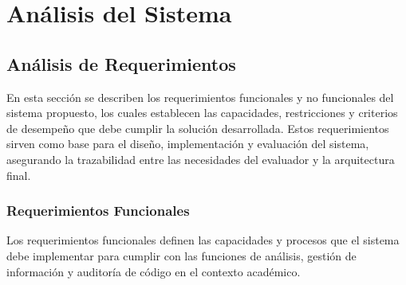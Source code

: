 \chapter{Análisis del Sistema}

\section{Análisis de Requerimientos}

En esta sección se describen los requerimientos funcionales y no funcionales del sistema propuesto, los cuales establecen las capacidades, restricciones y criterios de desempeño que debe cumplir la solución desarrollada. Estos requerimientos sirven como base para el diseño, implementación y evaluación del sistema, asegurando la trazabilidad entre las necesidades del evaluador y la arquitectura final.

\subsection{Requerimientos Funcionales}

Los requerimientos funcionales definen las capacidades y procesos que el sistema debe implementar para cumplir con las funciones de análisis, gestión de información y auditoría de código en el contexto académico.

